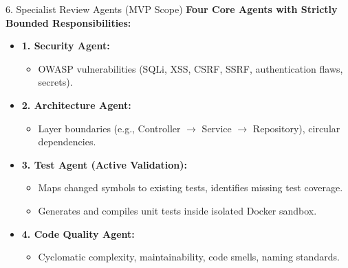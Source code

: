 \documentclass[aspectratio=169,11pt]{beamer}
\begin{document}
\begin{frame}{6. Specialist Review Agents (MVP Scope)}
  \textbf{Four Core Agents with Strictly Bounded Responsibilities:}
  \vspace{0.25cm}
  \begin{itemize}
    \item \textbf{1. Security Agent:}
      \begin{itemize}
        \item OWASP vulnerabilities (SQLi, XSS, CSRF, SSRF, authentication flaws, secrets).
      \end{itemize}
    \vspace{0.15cm}
    \item \textbf{2. Architecture Agent:}
      \begin{itemize}
        \item Layer boundaries (e.g., Controller $\rightarrow$ Service $\rightarrow$ Repository), circular dependencies.
      \end{itemize}
    \vspace{0.15cm}
    \item \textbf{3. Test Agent (Active Validation):}
      \begin{itemize}
        \item Maps changed symbols to existing tests, identifies missing test coverage.
        \item Generates and compiles unit tests inside isolated Docker sandbox.
      \end{itemize}
    \vspace{0.15cm}
    \item \textbf{4. Code Quality Agent:}
      \begin{itemize}
        \item Cyclomatic complexity, maintainability, code smells, naming standards.
      \end{itemize}
  \end{itemize}
\end{frame}
\end{document}
